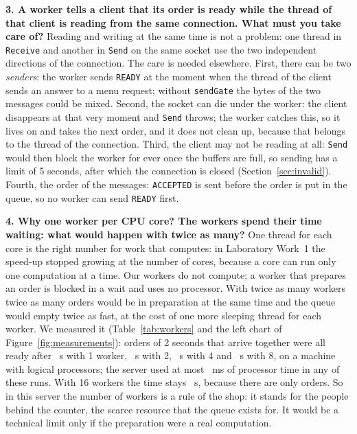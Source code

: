 \documentclass[12pt,a4paper]{article}
\begin{document}
\textbf{3. A worker tells a client that its order is ready while the thread of that client is reading from the same connection. What must you take care of?} Reading and writing at the same time is not a problem: one thread in \texttt{Receive} and another in \texttt{Send} on the same socket use the two independent directions of the connection. The care is needed elsewhere. First, there can be two \emph{senders}: the worker sends \texttt{READY} at the moment when the thread of the client sends an answer to a menu request; without \texttt{sendGate} the bytes of the two messages could be mixed. Second, the socket can die under the worker: the client disappears at that very moment and \texttt{Send} throws; the worker catches this, so it lives on and takes the next order, and it does not clean up, because that belongs to the thread of the connection. Third, the client may not be reading at all: \texttt{Send} would then block the worker for ever once the buffers are full, so sending has a limit of 5 seconds, after which the connection is closed (Section~\ref{sec:invalid}). Fourth, the order of the messages: \texttt{ACCEPTED} is sent before the order is put in the queue, so no worker can send \texttt{READY} first.

\textbf{4. Why one worker per CPU core? The workers spend their time waiting: what would happen with twice as many?} One thread for each core is the right number for work that computes: in Laboratory Work~1 the speed-up stopped growing at the number of cores, because a core can run only one computation at a time. Our workers do not compute; a worker that prepares an order is blocked in a wait and uses no processor. With twice as many workers twice as many orders would be in preparation at the same time and the queue would empty twice as fast, at the cost of one more sleeping thread for each worker. We measured it (Table~\ref{tab:workers} and the left chart of Figure~\ref{fig:measurements}): \workOrders{} orders of 2 seconds that arrive together were all ready after \workSecondsOne~s with 1 worker, \workSecondsTwo~s with 2, \workSecondsFour~s with 4 and \workSecondsEight~s with 8, on a machine with \envLogical{} logical processors; the server used at most \workCpuMax~ms of processor time in any of these runs. With 16 workers the time stays \workSecondsSixteen~s, because there are only \workOrders{} orders. So in this server the number of workers is a rule of the shop: it stands for the people behind the counter, the scarce resource that the queue exists for. It would be a technical limit only if the preparation were a real computation.
\end{document}
